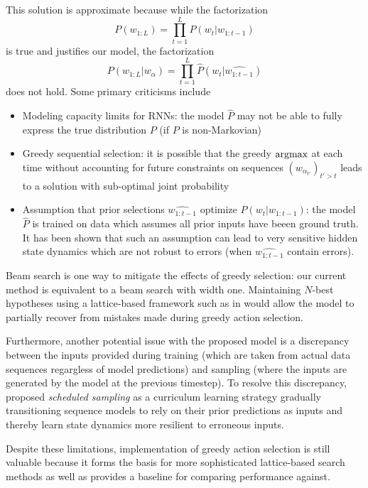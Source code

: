 This solution is approximate because while the factorization
\begin{equation}
  P(w_{1:L}) = \prod_{t=1}^L P(w_t | w_{1:t-1})
\end{equation}
is true and justifies our model, the factorization
\begin{equation}
  P(w_{1:L} | w_{\alpha}) = \prod_{t=1}^L \hat{P}(w_t | \hat{w_{1:t-1}} )
\end{equation}
does not hold. Some primary criticisms include
\begin{itemize}
  \item Modeling capacity limits for RNNs: the model $\hat{P}$ may not be able to fully express
    the true distribution $P$ (\eg if $P$ is non-Markovian)
  \item Greedy sequential selection: it is possible that the greedy $\operatorname*{argmax}$ at each
    time without accounting for future constraints on sequences $(w_{\alpha_{t'}})_{t' > t}$
    leads to a solution with sub-optimal joint probability
  \item Assumption that prior selections $\hat{w_{1:t-1}}$ optimize $P(w_t | w_{1:t-1})$:
    the model $\hat{P}$ is trained on data which assumes all prior inputs have beeen
    ground truth. It has been shown  that such an assumption can lead to
    very sensitive hidden state dynamics which are not robust to errors (\ie when
    $\hat{w_{1:t-1}}$ contain errors).
\end{itemize}
Beam search is one way to mitigate the effects of greedy selection: our current
method is equivalent to a beam search with width one. Maintaining $N$-best
hypotheses using a lattice-based framework such as in \citet{liu2014efficient}
would allow the model to partially recover from mistakes made during greedy
action selection.

Furthermore, another potential issue with the proposed model is a discrepancy
between the inputs provided during training (which are taken from actual data
sequences regargless of model predictions) and sampling (where the inputs are
generated by the model at the previous timestep). To resolve this discrepancy,
\citet{bengio2015scheduled} proposed \emph{scheduled sampling} as a curriculum
learning strategy gradually transitioning sequence models to rely on their
prior predictions as inputs and thereby learn state dynamics more resilient to
erroneous inputs.

Despite these limitations, implementation of greedy action selection is still
valuable because it forms the basis for more sophisticated lattice-based search
methods as well as provides a baseline for comparing performance against.


